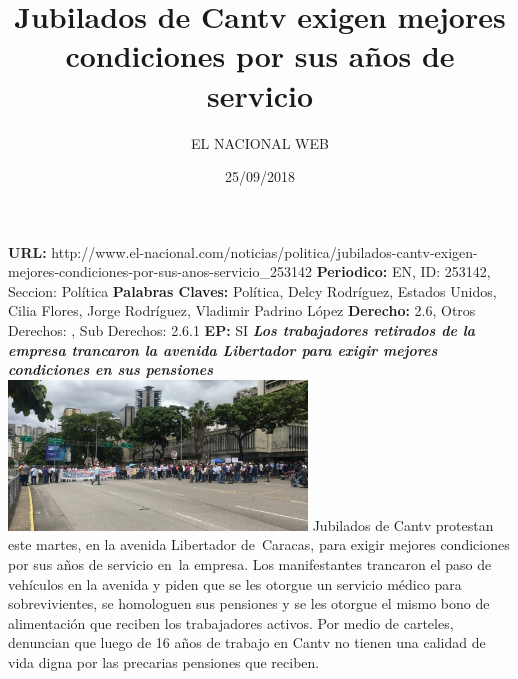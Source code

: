 \documentclass{article}%
\title{\textbf{Jubilados de Cantv exigen mejores condiciones por sus años de servicio}}%
\author{EL NACIONAL WEB}%
\date{25/09/2018}%
\begin{document}
%
\normalsize%
\maketitle%
\textbf{URL: }%
http://www.el{-}nacional.com/noticias/politica/jubilados{-}cantv{-}exigen{-}mejores{-}condiciones{-}por{-}sus{-}anos{-}servicio\_253142\newline%
%
\textbf{Periodico: }%
EN, %
ID: %
253142, %
Seccion: %
Política\newline%
%
\textbf{Palabras Claves: }%
Política, Delcy Rodríguez, Estados Unidos, Cilia Flores, Jorge Rodríguez, Vladimir Padrino López\newline%
%
\textbf{Derecho: }%
2.6, %
Otros Derechos: %
, %
Sub Derechos: %
2.6.1\newline%
%
\textbf{EP: }%
SI\newline%
\newline%
%
\textbf{\textit{Los trabajadores retirados de la empresa trancaron la avenida Libertador para exigir mejores condiciones en sus pensiones}}%
\newline%
\newline%
%
\includegraphics[width=300px]{102.jpg}%
\newline%
%
Jubilados de Cantv protestan este martes, en la avenida Libertador de~Caracas, para exigir mejores condiciones por sus años de servicio en~la empresa.%
\newline%
%
Los manifestantes trancaron el paso de vehículos en la avenida y piden que se les otorgue un servicio médico para sobrevivientes, se homologuen sus pensiones y se les otorgue el mismo bono de alimentación que reciben los trabajadores activos.%
\newline%
%
Por medio de carteles, denuncian que luego de 16 años de trabajo en Cantv no tienen una calidad de vida digna por las precarias pensiones que reciben.%
\newline%
%
\end{document}
